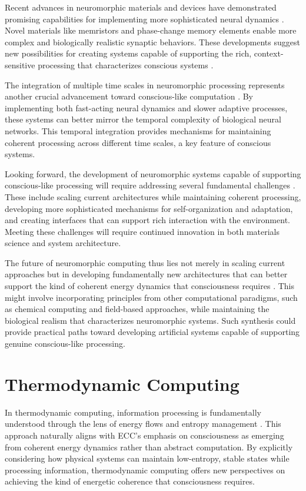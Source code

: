 \begin{refsection}
Recent advances in neuromorphic materials and devices have demonstrated promising capabilities for implementing more sophisticated neural dynamics \cite{Thakur2018}. Novel materials like memristors and phase-change memory elements enable more complex and biologically realistic synaptic behaviors. These developments suggest new possibilities for creating systems capable of supporting the rich, context-sensitive processing that characterizes conscious systems \cite{Wang2018}.

The integration of multiple time scales in neuromorphic processing represents another crucial advancement toward conscious-like computation \cite{Yang2019}. By implementing both fast-acting neural dynamics and slower adaptive processes, these systems can better mirror the temporal complexity of biological neural networks. This temporal integration provides mechanisms for maintaining coherent processing across different time scales, a key feature of conscious systems.

Looking forward, the development of neuromorphic systems capable of supporting conscious-like processing will require addressing several fundamental challenges \cite{Indiveri2020}. These include scaling current architectures while maintaining coherent processing, developing more sophisticated mechanisms for self-organization and adaptation, and creating interfaces that can support rich interaction with the environment. Meeting these challenges will require continued innovation in both materials science and system architecture.

The future of neuromorphic computing thus lies not merely in scaling current approaches but in developing fundamentally new architectures that can better support the kind of coherent energy dynamics that consciousness requires \cite{Markovic2020}. This might involve incorporating principles from other computational paradigms, such as chemical computing and field-based approaches, while maintaining the biological realism that characterizes neuromorphic systems. Such synthesis could provide practical paths toward developing artificial systems capable of supporting genuine conscious-like processing.

\section{Thermodynamic Computing}

In thermodynamic computing, information processing is fundamentally understood through the lens of energy flows and entropy management \cite{Bennett2019}. This approach naturally aligns with ECC's emphasis on consciousness as emerging from coherent energy dynamics rather than abstract computation. By explicitly considering how physical systems can maintain low-entropy, stable states while processing information, thermodynamic computing offers new perspectives on achieving the kind of energetic coherence that consciousness requires.


\end{refsection}
